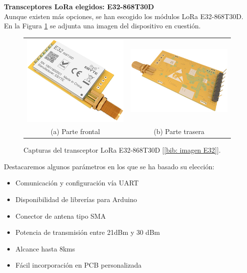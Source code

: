\documentclass[12pt]{article}
\begin{document}
	\noindent \textbf{Transceptores LoRa elegidos: E32-868T30D} \\
	
	\noindent Aunque existen más opciones, se han escogido los módulos LoRa E32-868T30D. En la Figura \ref{fig: capturas E32.} se adjunta una imagen del dispositivo en cuestión. \\
	
	\begin{figure}[h!]
		\begin{center}
			\begin{tabular}{cc}
				\includegraphics[width=60mm]{img/e32_front.png} &   \includegraphics[width=60mm]{img/e32_rear.png} \\
				(a) Parte frontal & (b) Parte trasera\\[6pt]
			\end{tabular}
			\caption{Capturas del transceptor LoRa E32-868T30D [\ref{bib: imagen E32}].}
			\label{fig: capturas E32.}
		\end{center}
	\end{figure}	
	
	\noindent Destacaremos algunos parámetros en los que se ha basado su elección: 
	
	\begin{itemize}
		\item Comunicación y configuración vía UART
		\item Disponibilidad de librerías para Arduino
		\item Conector de antena tipo SMA
		\item Potencia de transmisión entre 21dBm y 30 dBm 
		\item Alcance hasta 8kms
		\item Fácil incorporación en PCB personalizada
	\end{itemize}
	
\end{document}
